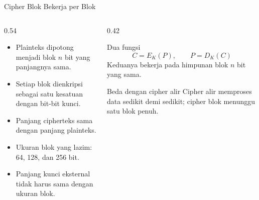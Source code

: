 \documentclass[aspectratio=169,11pt]{beamer}
\begin{document}
\begin{frame}{Cipher Blok Bekerja per Blok}
    \begin{columns}[T,onlytextwidth]
        \begin{column}{0.54\textwidth}
            \footnotesize
            \begin{itemize}
                \item Plainteks dipotong menjadi blok $n$ bit yang
                      panjangnya sama.
                \item Setiap blok dienkripsi sebagai satu kesatuan dengan
                      bit-bit kunci.
                \item Panjang cipherteks sama dengan panjang plainteks.
                \item Ukuran blok yang lazim: 64, 128, dan 256 bit.
                \item Panjang kunci eksternal tidak harus sama dengan
                      ukuran blok.
            \end{itemize}
        \end{column}
        \begin{column}{0.42\textwidth}
            \begin{block}{Dua fungsi}
                \[
                    C = E_K(P), \qquad P = D_K(C)
                \]
                \footnotesize
                Keduanya bekerja pada himpunan blok $n$ bit yang sama.
            \end{block}
            \begin{alertblock}{Beda dengan cipher alir}
                \footnotesize
                Cipher alir memproses data sedikit demi sedikit; cipher
                blok menunggu satu blok penuh.
            \end{alertblock}
        \end{column}
    \end{columns}
\end{frame}
\end{document}
